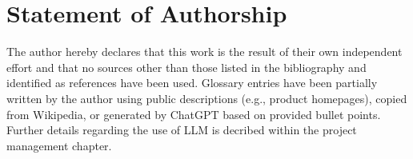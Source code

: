 \chapter{Statement of Authorship}
The author hereby declares that this work is the result of their own independent effort and that no sources other than those listed in the bibliography and identified as references have been used.  
Glossary entries have been partially written by the author using public descriptions (e.g., product homepages), copied from Wikipedia, or generated by ChatGPT based on provided bullet points. Further details regarding the use of LLM is decribed within the project management chapter.
